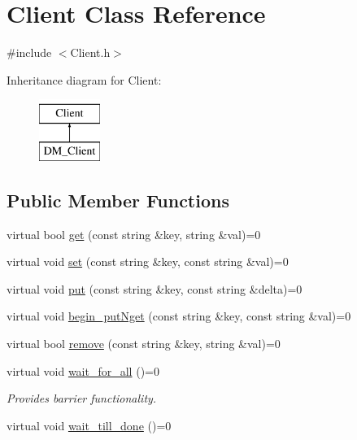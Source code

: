 \hypertarget{class_client}{
\section{Client Class Reference}
\label{class_client}
}


{\ttfamily \#include $<$Client.h$>$}

Inheritance diagram for Client:\begin{figure}[H]
\begin{center}
\leavevmode
\includegraphics[height=2cm]{class_client}
\end{center}
\end{figure}
\subsection*{Public Member Functions}
\begin{DoxyCompactItemize}
\item 
virtual bool \hyperlink{class_client_aa1e3f5566dadd85d3ac575c7978f65ea}{get} (const string \&key, string \&val)=0
\item 
virtual void \hyperlink{class_client_a5efb1076768c93a53355bc7bdc8b430f}{set} (const string \&key, const string \&val)=0
\item 
virtual void \hyperlink{class_client_a7369bb878f12a07b717638efb5871668}{put} (const string \&key, const string \&delta)=0
\item 
virtual void \hyperlink{class_client_a3c7e1cbb61e8a9b2c5c89de884f22253}{begin\_\-putNget} (const string \&key, const string \&val)=0
\item 
virtual bool \hyperlink{class_client_ac60bd2cf7928c64a662fa8c0af748d0c}{remove} (const string \&key, string \&val)=0
\item 
virtual void \hyperlink{class_client_af1bfd186c6afcddd19e0e6f69e1a8fc1}{wait\_\-for\_\-all} ()=0
\begin{DoxyCompactList}\small\item\em Provides barrier functionality. \item\end{DoxyCompactList}\item 
virtual void \hyperlink{class_client_a7cc1fed7f1d161586a8abef93a24b715}{wait\_\-till\_\-done} ()=0
\end{DoxyCompactItemize}


